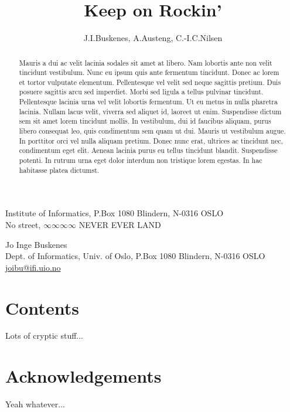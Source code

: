 \documentclass[
  bibtex                                       %
]{uam}
\begin{document}
\pagestyle{plain}


\title{Keep on Rockin'}
%
\author{J.I.Buskenes\firstAddress, A.Austeng\firstAddress, C.-I.C.Nilsen\secondAddress}
%
\begin{contact}
  \firstAddress Institute of Informatics, P.Box 1080 Blindern, N-0316 OSLO \\
  \secondAddress No street, $\infty\infty\infty\infty$ NEVER EVER LAND
\end{contact}
%
\begin{contact}
Jo Inge Buskenes \\
Dept. of Informatics, Univ. of Oslo, P.Box 1080 Blindern, N-0316 OSLO \\
\href{mailto:joibu@ifi.uio.no}{joibu@ifi.uio.no}
\end{contact}
%
\begin{abstract}
Mauris a dui ac velit lacinia sodales sit amet at libero. Nam lobortis ante non velit tincidunt vestibulum. Nunc eu ipsum quis ante fermentum tincidunt. Donec ac lorem et tortor vulputate elementum. Pellentesque vel velit sed neque sagittis pretium. Duis posuere sagittis arcu sed imperdiet. Morbi sed ligula a tellus pulvinar tincidunt. Pellentesque lacinia urna vel velit lobortis fermentum. Ut eu metus in nulla pharetra lacinia. Nullam lacus velit, viverra sed aliquet id, laoreet ut enim. Suspendisse dictum sem sit amet lorem tincidunt mollis. In vestibulum, dui id faucibus aliquam, purus libero consequat leo, quis condimentum sem quam ut dui. Mauris ut vestibulum augue. In porttitor orci vel nulla aliquam pretium. Donec nunc erat, ultrices ac tincidunt nec, condimentum eget elit. Aenean lacinia purus eu tellus tincidunt blandit. Suspendisse potenti. In rutrum urna eget dolor interdum non tristique lorem egestas. In hac habitasse platea dictumst.
\end{abstract}
%


\newpage
\section{Contents}

Lots of cryptic stuff...


\section*{Acknowledgements}

Yeah whatever... \cite{JohnDoe10}





\the\abovecaptionskip
\the\belowcaptionskip
\end{document}

